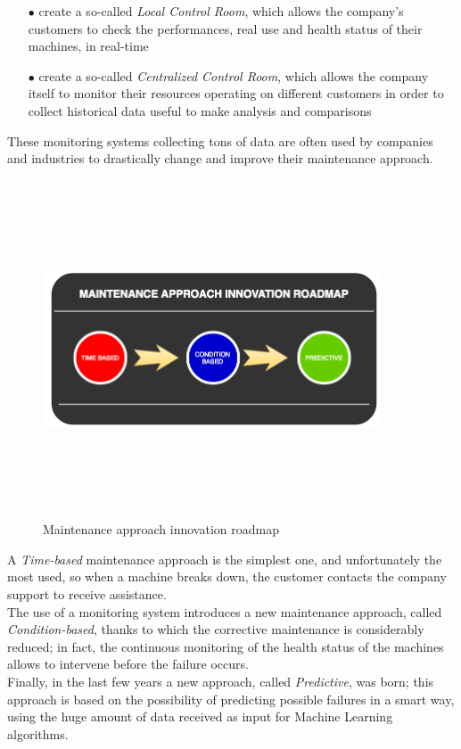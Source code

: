 \documentclass[12pt]{report}
\begin{document}
{\begin{itemize}
\setlength{\itemindent}{+4mm}
\item[$\bullet$] create a so-called \emph{Local Control Room}, which allows the company's customers to check the performances, real use and health status of their machines, in real-time
\item[$\bullet$] create a so-called \emph{Centralized Control Room}, which allows the company itself to monitor their resources operating on different customers in order to collect historical data useful to make analysis and comparisons
\end{itemize}

These monitoring systems collecting tons of data are often used by companies and industries to drastically change and improve their maintenance approach.

\begin{figure}[H]
\includegraphics[width=10cm,height=10cm,keepaspectratio]{maintenance_approach}
\centering
\caption{Maintenance approach innovation roadmap}
\end{figure}

A \emph{Time-based} maintenance approach is the simplest one, and unfortunately the most used, so when a machine breaks down, the customer contacts the company support to receive assistance.\\
The use of a monitoring system introduces a new maintenance approach, called \emph{Condition-based}, thanks to which the corrective maintenance is considerably reduced; in fact, the continuous monitoring of the health status of the machines allows to intervene before the failure occurs.\\
Finally, in the last few years a new approach, called \emph{Predictive}, was born; this approach is based on the possibility of predicting possible failures in a smart way, using the huge amount of data received as input for Machine Learning algorithms.\\

}
\end{document}
